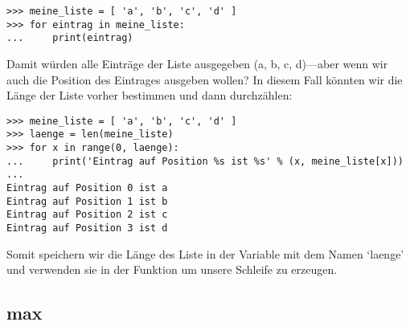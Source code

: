 \begin{Verbatim}[frame=single]
>>> meine_liste = [ 'a', 'b', 'c', 'd' ]
>>> for eintrag in meine_liste:
...     print(eintrag)
\end{Verbatim}

\noindent
Damit würden alle Einträge der Liste ausgegeben (a, b, c, d)---aber wenn wir auch die Position des Eintrages ausgeben wollen? In diesem Fall könnten wir die Länge der Liste vorher bestimmen und dann durchzählen:

\begin{Verbatim}[frame=single]
>>> meine_liste = [ 'a', 'b', 'c', 'd' ]
>>> laenge = len(meine_liste)
>>> for x in range(0, laenge):
...     print('Eintrag auf Position %s ist %s' % (x, meine_liste[x]))
...
Eintrag auf Position 0 ist a
Eintrag auf Position 1 ist b
Eintrag auf Position 2 ist c
Eintrag auf Position 3 ist d
\end{Verbatim}

\noindent
Somit speichern wir die Länge des Liste in der Variable mit dem Namen `laenge' und verwenden sie in der  Funktion um unsere Schleife zu erzeugen.

\subsection*{max}

